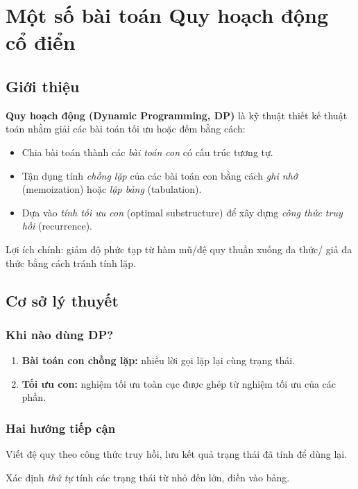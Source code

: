 \chapter{Một số bài toán Quy hoạch động cổ điển}

\minitoc

\section{Giới thiệu}
\textbf{Quy hoạch động (Dynamic Programming, DP)} là kỹ thuật thiết kế thuật toán nhằm giải các bài toán tối ưu hoặc đếm bằng cách:
\begin{itemize}[noitemsep,topsep=2pt]
  \item Chia bài toán thành các \emph{bài toán con} có cấu trúc tương tự.
  \item Tận dụng tính \emph{chồng lặp} của các bài toán con bằng cách \textit{ghi nhớ} (memoization) hoặc \textit{lập bảng} (tabulation).
  \item Dựa vào \emph{tính tối ưu con} (optimal substructure) để xây dựng \emph{công thức truy hồi} (recurrence).
\end{itemize}
Lợi ích chính: giảm độ phức tạp từ hàm mũ/đệ quy thuần xuống đa thức/ giả đa thức bằng cách tránh tính lặp.

\section{Cơ sở lý thuyết}
\subsection*{Khi nào dùng DP?}
\begin{enumerate}[label=\arabic*.,noitemsep,topsep=2pt]
  \item \textbf{Bài toán con chồng lặp:} nhiều lời gọi lặp lại cùng trạng thái.
  \item \textbf{Tối ưu con:} nghiệm tối ưu toàn cục được ghép từ nghiệm tối ưu của các phần.
\end{enumerate}

\subsection*{Hai hướng tiếp cận}
\begin{description}[noitemsep,topsep=2pt]
  \item[Top-down (Memoization):] Viết đệ quy theo công thức truy hồi, lưu kết quả trạng thái đã tính để dùng lại.
  \item[Bottom-up (Tabulation):] Xác định \emph{thứ tự} tính các trạng thái từ nhỏ đến lớn, điền vào bảng.
\end{description}

